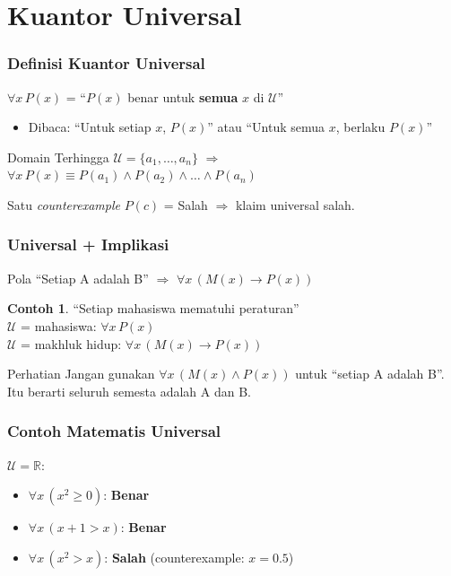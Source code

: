 \documentclass[handout]{beamer}
\theoremstyle{definition}
\theoremstyle{example}
\newtheorem{contoh}[theorem]{Contoh}
\begin{document}
\section{Kuantor Universal}

\begin{frame}
\frametitle{Definisi Kuantor Universal}
$\forall x \, P(x)$ = ``$P(x)$ benar untuk \textbf{semua} $x$ di $\mathcal{U}$''
\begin{itemize}
  \item Dibaca: ``Untuk setiap $x$, $P(x)$'' atau ``Untuk semua $x$, berlaku $P(x)$''
\end{itemize}
\begin{block}{Domain Terhingga}
$\mathcal{U} = \{a_1, \ldots, a_n\}$ $\Rightarrow$ $\forall x \, P(x) \equiv P(a_1) \land P(a_2) \land \ldots \land P(a_n)$
\end{block}
Satu \textit{counterexample} $P(c)$ = Salah $\Rightarrow$ klaim universal salah.
\end{frame}

\begin{frame}
\frametitle{Universal + Implikasi}
Pola ``Setiap A adalah B'' $\Rightarrow$ $\forall x \, (M(x) \rightarrow P(x))$
\begin{contoh}
``Setiap mahasiswa mematuhi peraturan''\\
$\mathcal{U}$ = mahasiswa: $\forall x \, P(x)$\\
$\mathcal{U}$ = makhluk hidup: $\forall x \, (M(x) \rightarrow P(x))$
\end{contoh}
\begin{alertblock}{Perhatian}
Jangan gunakan $\forall x \, (M(x) \land P(x))$ untuk ``setiap A adalah B''. Itu berarti seluruh semesta adalah A dan B.
\end{alertblock}
\end{frame}

\begin{frame}
\frametitle{Contoh Matematis Universal}
$\mathcal{U} = \mathbb{R}$:
\begin{itemize}
  \item $\forall x \, (x^2 \geq 0)$: \textbf{Benar}
  \item $\forall x \, (x + 1 > x)$: \textbf{Benar}
  \item $\forall x \, (x^2 > x)$: \textbf{Salah} (counterexample: $x = 0.5$)
\end{itemize}
\end{frame}
\end{document}
